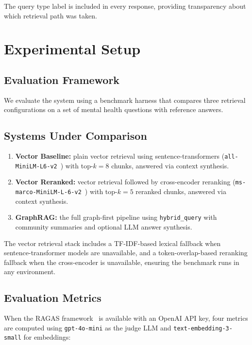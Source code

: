 \documentclass[12pt,a4paper]{article}
\begin{document}
The query type label is included in every response, providing transparency about which retrieval path was taken.

\section{Experimental Setup}

\subsection{Evaluation Framework}

We evaluate the system using a benchmark harness that compares three retrieval configurations on a set of mental health questions with reference answers.

\subsection{Systems Under Comparison}

\begin{enumerate}[nosep]
    \item \textbf{Vector Baseline:} plain vector retrieval using sentence-transformers (\texttt{all-MiniLM-L6-v2}~\cite{reimers2019sentbert}) with top-$k=8$ chunks, answered via context synthesis.
    \item \textbf{Vector Reranked:} vector retrieval followed by cross-encoder reranking (\texttt{ms-marco-MiniLM-L-6-v2}~\cite{nogueira2020crossencoder}) with top-$k=5$ reranked chunks, answered via context synthesis.
    \item \textbf{GraphRAG:} the full graph-first pipeline using \texttt{hybrid\_query} with community summaries and optional LLM answer synthesis.
\end{enumerate}

The vector retrieval stack includes a TF-IDF-based lexical fallback when sentence-transformer models are unavailable, and a token-overlap-based reranking fallback when the cross-encoder is unavailable, ensuring the benchmark runs in any environment.

\subsection{Evaluation Metrics}

When the RAGAS framework~\cite{es2024ragas} is available with an OpenAI API key, four metrics are computed using \texttt{gpt-4o-mini} as the judge LLM and \texttt{text-embedding-3-small} for embeddings:
\end{document}
